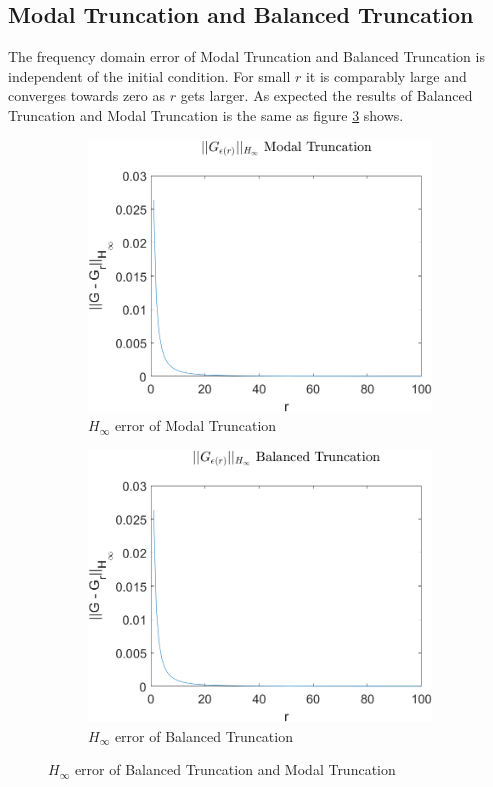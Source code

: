 \subsection{Modal Truncation and Balanced Truncation}
The frequency domain error of Modal Truncation and Balanced Truncation is independent of the initial condition.
For small \(r\) it is comparably large and converges towards zero as \(r\) gets larger.
As expected the results of Balanced Truncation and Modal Truncation is the same as figure \ref{FIG-H-BTMT} shows.
\begin{figure}[H]
\begin{subfigure}[b]{0.5\textwidth}
\centering
\includegraphics[width=\textwidth]{images/freq/H_MT}
\caption{$H_{\infty}$ error of Modal Truncation}
\label{FIG-H-MT}
\end{subfigure}
\begin{subfigure}[b]{0.5\textwidth}
\centering
\includegraphics[width=\textwidth]{images/freq/H_BT}
\caption{$H_{\infty}$ error of Balanced Truncation}
\label{FIG-H-BT}
\end{subfigure}
\caption{$H_{\infty}$ error of Balanced Truncation and Modal Truncation}
\label{FIG-H-BTMT}
\end{figure}


